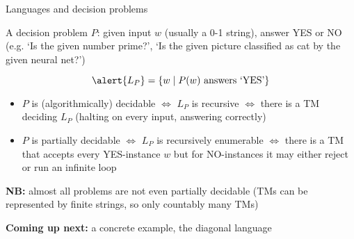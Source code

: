 \documentclass[handout]{beamer}
\begin{document}
\begin{frame}{Languages and decision problems}
    
    A \alert{decision problem} $P$: given input $w$ (usually a 0-1 string), answer YES or NO (e.g. `Is the given number prime?',  `Is the given picture classified as cat by the given neural net?')
    
    \vspace{-10pt}
    $$
    \alert{L_P}=\{w\mid P(w)\text{ answers `YES'}\}
    $$

    \begin{itemize}
        \item $P$ is \alert{(algorithmically) decidable} $\Leftrightarrow$ $L_P$ is \alert{recursive} $\Leftrightarrow$ there is a TM \alert{deciding} $L_P$ (halting on every input, answering correctly)
        \item $P$ is \alert{partially decidable} $\Leftrightarrow$ $L_P$ is \alert{recursively enumerable} $\Leftrightarrow$ there is a TM that accepts every YES-instance $w$ but for NO-instances it may either reject or run an infinite loop
    \end{itemize}

    \textbf{NB:} almost all problems are not even partially decidable (TMs can be represented by finite strings, so only countably many TMs)
    
    \textbf{Coming up next:} a concrete example, the \alert{diagonal language}

\end{frame}
\end{document}
